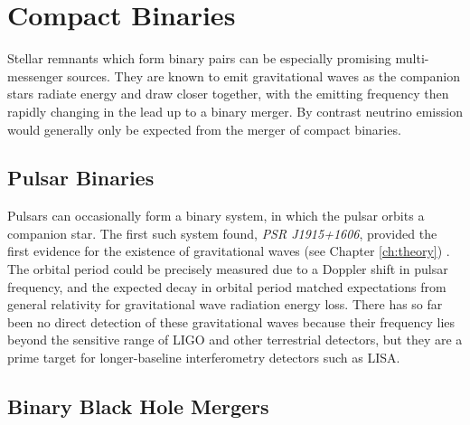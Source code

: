 
\section{Compact Binaries}
\label{sec:ns_mergers}

Stellar remnants which form binary pairs can be especially promising multi-messenger sources. They are known to emit gravitational waves as the companion stars radiate energy and draw closer together, with the emitting frequency then rapidly changing in the lead up to a binary merger. By contrast neutrino emission would generally only be expected from the merger of compact binaries.


\subsection*{Pulsar Binaries}

Pulsars can occasionally form a binary system, in which the pulsar orbits a companion star. The first such system found, \emph{PSR J1915+1606}, provided the first evidence for the existence of gravitational waves (see Chapter \ref{ch:theory}) . The orbital period could be precisely measured due to a Doppler shift in pulsar frequency, and the expected decay in orbital period matched expectations from general relativity for gravitational wave radiation energy loss. There has so far been no direct detection of these gravitational waves because their frequency lies beyond the sensitive range of LIGO and other terrestrial detectors, but they are a prime target for longer-baseline interferometry detectors such as LISA. 

\subsection*{Binary Black Hole Mergers}

